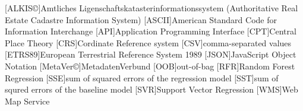 \documentclass[a4paper, 11pt, oneside]{Thesis}  %
\begin{document}
\begin{acronym}
[ALKIS\copyright]{Amtliches Ligenschaftskatasterinformationssystem (Authoritative Real Estate Cadastre Information System)}
[ASCII]{American Standard Code for Information Interchange}
[API]{Application Programming Interface}
[CPT]{Central Place Theory}
[CRS]{Cordinate Reference system}
[CSV]{comma-separated values}
[ETRS89]{European Terrestrial Reference System 1989}
[JSON]{JavaScript Object Notation}
[MetaVer\copyright]{MetadatenVerbund}
[OOB]{out-of-bag}
[RFR]{Random Forest Regression}
[SSE]{sum of squared errors of the regression model}
[SST]{sum of squred errors of the baseline model}
[SVR]{Support Vector Regression}
[WMS]{Web Map Service}

\end{acronym}

{

}

{
}


\end{document}
